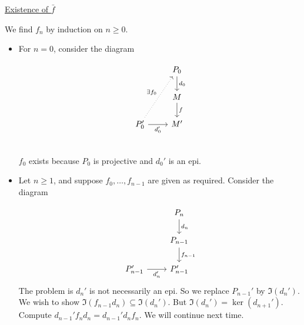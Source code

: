 \documentclass[x11names,reqno,14pt]{extarticle}
\newcommand{\barf}{\bar{f}}
\begin{document}
\proof

\underline{Existence of $\barf$} 

We find $f_n$ by induction on $n \geq 0$. 

\begin{itemize}

\item For $n = 0$, consider the diagram 

\[
\begin{tikzcd}
& P_0 \ar[d, "d_0"] \\
& M \ar[d, "f"] \\
P'_0 \ar[r, "d_0'"']\ar[uur, dotted, "\exists f_0"] & M' \\
\end{tikzcd}
\]

$f_0$ exists because $P_0$ is projective and $d_0'$ is an epi. 

\item Let $n \geq 1$, and suppose $f_0, \dots, f_{n - 1}$ are given as required. Consider the diagram 

\[
\begin{tikzcd}
&P_n \ar[d, "d_n"] \\
&P_{n - 1} \ar[d, "f_{n - 1}"] \\
P_{n - 1}'\ar[r, "d_n'"'] &P_{n - 1}' 
\end{tikzcd}
\]
The problem is $d_n'$ is not necessarily an epi. So we replace $P_{n - 1}'$ by $\Im(d_n')$. We wish to show $\Im(f_{n - 1}d_n) \subseteq \Im(d_n')$. But $\Im(d_n') = \ker(d_{n + 1}')$. Compute $d_{n - 1}'f_nd_n = d_{n - 1}'d_nf_n$. We will continue next time.

\end{itemize}
\end{document}
